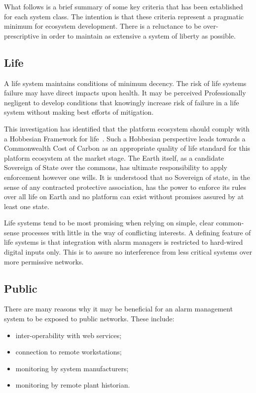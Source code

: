\documentclass[11pt, oneside]{article}   	%
\begin{document}
\pagebreak

What follows is a brief summary of some key criteria that has been established for each system class.
The intention is that these criteria represent a pragmatic minimum for ecosystem development.
There is a reluctance to be over-prescriptive in order to maintain as extensive a system of liberty as possible.

\subsection{Life}
A life system maintains conditions of minimum decency.
The risk of life systems failure may have direct impacts upon health.
It may be perceived Professionally negligent to develop conditions that knowingly increase risk of failure in a life system without making best efforts of mitigation.\

This investigation has identified that the platform ecosystem should comply with a Hobbesian Framework for life~\cite{th1}.
Such a Hobbesian perspective leads towards a Commonwealth Cost of Carbon as an appropriate quality of life standard for this platform ecosystem at the market stage.
The Earth itself, as a candidate Sovereign of State over the commons, has ultimate responsibility to apply enforcement however one wills.
It is understood that no Sovereign of state, in the sense of any contracted protective association, has the power to enforce its rules over all life on Earth and no platform can exist without promises assured by at least one state.\

Life systems tend to be most promising when relying on simple, clear common-sense processes with little in the way of conflicting interests.
A defining feature of life systems is that integration with alarm managers is restricted to hard-wired digital inputs only.
This is to assure no interference from less critical systems over more permissive networks.\

\subsection{Public}

There are many reasons why it may be beneficial for an alarm management system to be exposed to public networks.
These include:
\begin{itemize}
	\item inter-operability with web services; 
	\item connection to remote workstations;
	\item monitoring by system manufacturers;
	\item monitoring by remote plant historian.
\end{itemize}\
\end{document}

